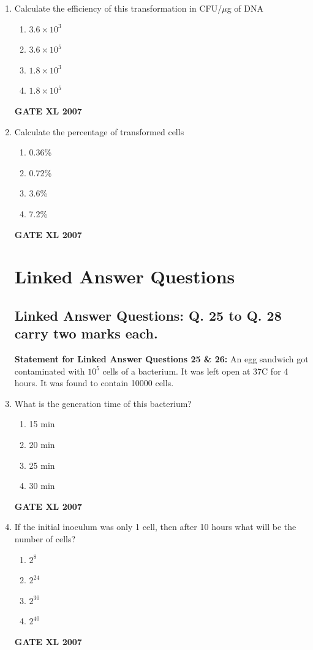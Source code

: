 \documentclass[journal,12pt,onecolumn]{IEEEtran}
\begin{document}
\begin{enumerate}
\item Calculate the efficiency of this transformation in CFU/$\mu$g of DNA
\begin{enumerate}
    \item $3.6 \times 10^3$
    \item $3.6 \times 10^5$
    \item $1.8 \times 10^3$
    \item $1.8 \times 10^5$
\end{enumerate}\hfill{\textbf{GATE XL 2007}}

\vspace{2em}


\item Calculate the percentage of transformed cells
\begin{enumerate}
    \item 0.36\%
    \item 0.72\%
    \item 3.6\%
    \item 7.2\%
\end{enumerate}\hfill{\textbf{GATE XL 2007}}

\vspace{2em}
\section*{Linked Answer Questions}
\subsection*{Linked Answer Questions: Q. 25 to Q. 28 carry two marks each.}

\textbf{Statement for Linked Answer Questions 25 \& 26:}
An egg sandwich got contaminated with $10^5$ cells of a bacterium. It was left open at 37\textdegree C for 4 hours. It was found to contain 10000 cells.

\item What is the generation time of this bacterium?
\begin{enumerate}
    \item 15 min
    \item 20 min
    \item 25 min
    \item 30 min
\end{enumerate}\hfill{\textbf{GATE XL 2007}}

\item If the initial inoculum was only 1 cell, then after 10 hours what will be the number of cells?
\begin{enumerate}
    \item $2^8$
    \item $2^{24}$
    \item $2^{30}$
    \item $2^{40}$
\end{enumerate}\hfill{\textbf{GATE XL 2007}}


\end{enumerate}
\end{document}
